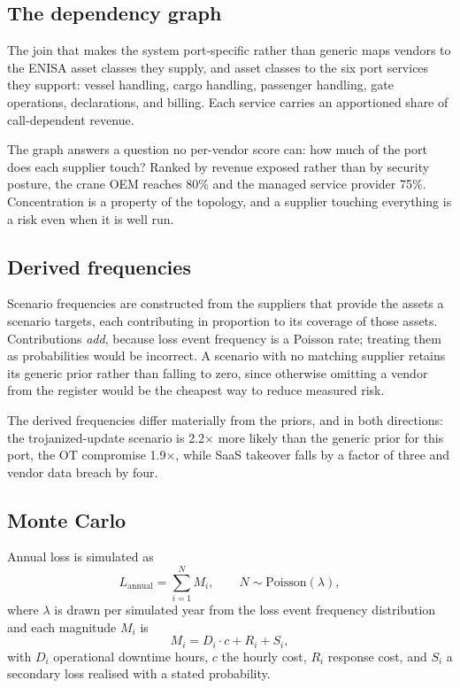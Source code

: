 \documentclass[conference]{IEEEtran}
\begin{document}
\subsection{The dependency graph}

The join that makes the system port-specific rather than generic maps vendors to
the ENISA asset classes they supply, and asset classes to the six port services
they support: vessel handling, cargo handling, passenger handling, gate operations,
declarations, and billing. Each service carries an apportioned share of
call-dependent revenue.

The graph answers a question no per-vendor score can: how much of the port does
each supplier touch? Ranked by revenue exposed rather than by security posture, the
crane OEM reaches 80\% and the managed service provider 75\%. Concentration is a
property of the topology, and a supplier touching everything is a risk even when it
is well run.

\subsection{Derived frequencies}

Scenario frequencies are constructed from the suppliers that provide the assets a
scenario targets, each contributing in proportion to its coverage of those assets.
Contributions \emph{add}, because loss event frequency is a Poisson rate; treating
them as probabilities would be incorrect. A scenario with no matching supplier
retains its generic prior rather than falling to zero, since otherwise omitting a
vendor from the register would be the cheapest way to reduce measured risk.

The derived frequencies differ materially from the priors, and in both directions:
the trojanized-update scenario is 2.2$\times$ more likely than the generic prior for
this port, the OT compromise 1.9$\times$, while SaaS takeover falls by a factor of
three and vendor data breach by four.

\subsection{Monte Carlo}

Annual loss is simulated as
\begin{equation}
L_{\textrm{annual}} = \sum_{i=1}^{N} M_i, \qquad N \sim \textrm{Poisson}(\lambda),
\end{equation}
where $\lambda$ is drawn per simulated year from the loss event frequency
distribution and each magnitude $M_i$ is
\begin{equation}
M_i = D_i \cdot c + R_i + S_i,
\end{equation}
with $D_i$ operational downtime hours, $c$ the hourly cost, $R_i$ response cost,
and $S_i$ a secondary loss realised with a stated probability.
\end{document}
